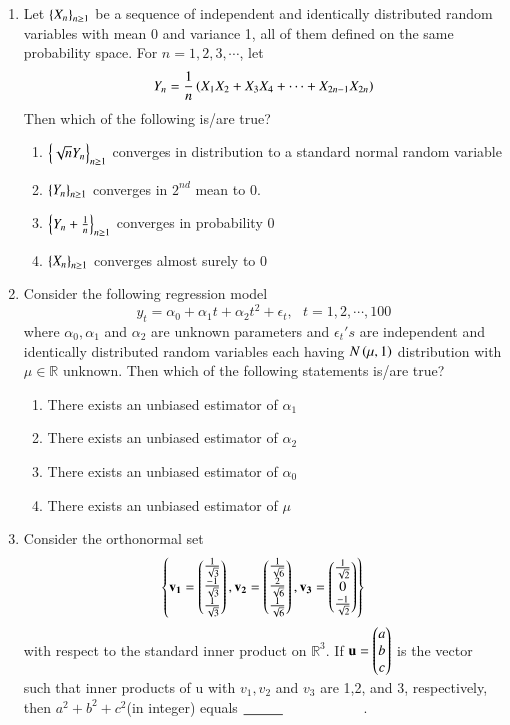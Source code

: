 \documentclass[journal,12pt,onecolumn]{IEEEtran}
\theoremstyle{remark}
\begin{document}
\begin{enumerate}
\begin{enumerate}
\end{enumerate}
\item Let $\left\{X_n\right\}_{n\geq1}$ be a sequence of independent and identically distributed random variables with mean 0 and variance 1, all of them defined on the same probability space. For $n=1,2,3,\cdots$, let 
$$Y_n=\frac{1}{n}\left(X_1X_2+X_3X_4+\cdots+X_{2n-1}X_{2n}\right)$$ Then which of the following is/are true?
\begin{enumerate}
    \item $\left\{\sqrt{n}Y_n\right\}_{n\geq1}$ converges in distribution to a standard normal random variable
    \item $\left\{Y_n\right\}_{n\geq1}$ converges in $2^{nd}$ mean to 0.
    \item $\left\{Y_n+\frac{1}{n}\right\}_{n\geq1}$ converges in probability 0
    \item $\left\{X_n\right\}_{n\geq 1}$ converges almost surely to 0
\end{enumerate}
\item Consider the following regression model $$y_t=\alpha_0+\alpha_1t+\alpha_2t^2+\epsilon_t, \text{ } t=1,2,\cdots,100$$ where $\alpha_0,\alpha_1$ and $\alpha_2$ are unknown parameters and $\epsilon_t's$ are independent and identically distributed random variables each having $N\left(\mu,1\right)$ distribution with $\mu \in \mathbb{R}$ unknown. Then which of the following statements is/are true?
\begin{enumerate}
    \item There exists an unbiased estimator of $\alpha_1$
    \item There exists an unbiased estimator of $\alpha_2$
    \item There exists an unbiased estimator of $\alpha_0$
    \item There exists an unbiased estimator of $\mu$
\end{enumerate}
\item Consider the orthonormal set $$\left\{\mathbf{v_1}=\begin{pmatrix}
\frac{1}{\sqrt{3}}\\\frac{-1}{\sqrt{3}}\\ \frac{1}{\sqrt{3}}\end{pmatrix},\mathbf{v_2}=\begin{pmatrix}
\frac{1}{\sqrt{6}}\\\frac{2}{\sqrt{6}}\\ \frac{1}{\sqrt{6}}\end{pmatrix},\mathbf{v_3}=\begin{pmatrix}
\frac{1}{\sqrt{2}}\\0\\ \frac{-1}{\sqrt{2}}\end{pmatrix}\right\}$$ with respect to the standard inner product on $\mathbb{R}^3. $ If $\mathbf{u}=\begin{pmatrix}a\\b\\c\end{pmatrix}$ is the vector such that inner products of u with $v_1,v_2$ and $v_3$ are 1,2, and 3, respectively, then $a^2+b^2+c^2$(in integer) equals $\makebox[3cm][l]{\underline{\hspace{1cm}}}$.

\end{enumerate}
\end{document}
